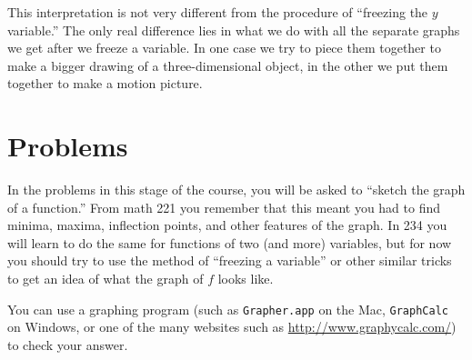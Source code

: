 This interpretation is not very different from the procedure of ``freezing the $y$
variable.'' The only real difference lies in what we do with all the separate graphs
we get after we freeze a variable. In one case we try to piece them together to make
a bigger drawing of a three-dimensional object, in the other we put them together to
make a motion picture.


\section*{Problems} 
\label{sec:graphing-problems-2d3d}
\problemfont 
In the problems in this stage of the course, you will be asked to
``sketch the graph of a function.''  From math 221 you remember that
this meant you had to find minima, maxima, inflection points, and other
features of the graph.  In 234 you will learn to do the same for
functions of two (and more) variables, but for now you should try to
use the method of ``freezing a variable'' or other similar tricks to
get an idea of what the graph of $f$ looks like.

You can use a graphing program (such as \texttt{Grapher.app} on the
Mac, \texttt{GraphCalc} on Windows, or one of the many websites such as
\url{http://www.graphycalc.com/}) to check your answer.


